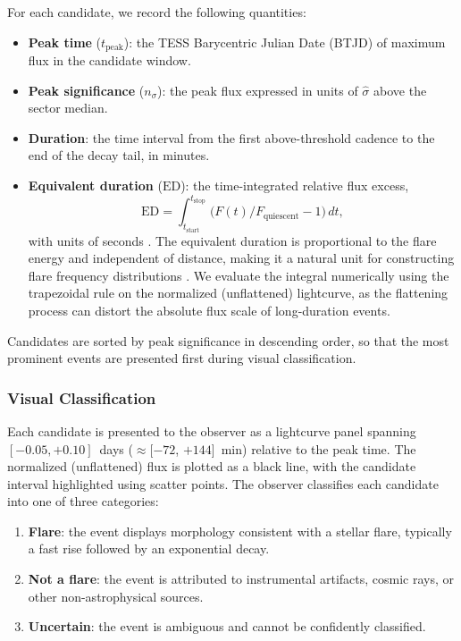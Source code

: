 For each candidate, we record the following quantities:
\begin{itemize}
  \item \textbf{Peak time} ($t_\mathrm{peak}$): the TESS Barycentric
    Julian Date (BTJD) of maximum flux in the candidate window.
  \item \textbf{Peak significance} ($n_\sigma$): the peak flux
    expressed in units of $\hat{\sigma}$ above the sector median.
  \item \textbf{Duration}: the time interval from the first
    above-threshold cadence to the end of the decay tail, in minutes.
  \item \textbf{Equivalent duration} ($\mathrm{ED}$): the
    time-integrated relative flux excess,
    \begin{equation}\label{eq:equiv_dur}
      \mathrm{ED} = \int_{t_\mathrm{start}}^{t_\mathrm{stop}}
        \bigl(F(t)/F_\mathrm{quiescent} - 1\bigr)\,dt,
    \end{equation}
    with units of seconds \citep{Hunt-Walker2012}.  The equivalent
    duration is proportional to the flare energy and independent of
    distance, making it a natural unit for constructing flare frequency
    distributions \citep{Hawley2014}.  We evaluate the integral
    numerically using the trapezoidal rule on the normalized
    (unflattened) lightcurve, as the flattening process can distort
    the absolute flux scale of long-duration events.
\end{itemize}

Candidates are sorted by peak significance in descending order, so
that the most prominent events are presented first during visual
classification.

\subsubsection{Visual Classification}\label{sec:classification}

Each candidate is presented to the observer as a lightcurve panel
spanning $[-0.05, +0.10]$~days ($\approx$[$-72$, $+144$]~min) relative
to the peak time.  The normalized (unflattened) flux is plotted as a
black line, with the candidate interval highlighted using scatter
points.  The observer classifies each candidate into one of three
categories:
\begin{enumerate}
  \item \textbf{Flare}: the event displays morphology consistent with
    a stellar flare, typically a fast rise followed by an exponential
    decay.
  \item \textbf{Not a flare}: the event is attributed to instrumental
    artifacts, cosmic rays, or other non-astrophysical sources.
  \item \textbf{Uncertain}: the event is ambiguous and cannot be
    confidently classified.
\end{enumerate}

